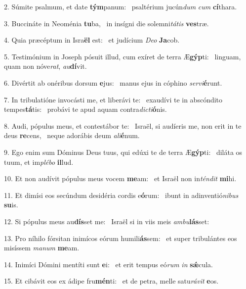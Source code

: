 2. Súmite psalmum, et date \textbf{tým}panum: \ast\  psaltérium jucún\textit{dum} \textit{cum} \textbf{cí}thara.\

3. Buccináte in Neoménia \textbf{tu}ba, \ast\  in insígni die solemni\textit{tá}\textit{tis} \textbf{ves}træ.\

4. Quia præcéptum in Isra\textbf{ël} est: \ast\  et judícium \textit{De}\textit{o} \textbf{Ja}cob.\

5. Testimónium in Joseph pósuit illud, cum exíret de terra Æ\textbf{gýp}ti: \ast\  linguam, quam non nóve\textit{rat}, \textit{au}\textbf{dí}vit.\

6. Divértit ab onéribus dorsum \textbf{e}jus: \ast\  manus ejus in cóphino \textit{ser}\textit{vi}\textbf{é}runt.\

7. In tribulatióne invocásti me, et liberávi te: \dag\  exaudívi te in abscóndito tempes\textbf{tá}tis: \ast\  probávi te apud aquam contra\textit{dic}\textit{ti}\textbf{ó}nis.\

8. Audi, pópulus meus, et contestábor te: \dag\  Israël, si audíeris me, non erit in te deus \textbf{re}cens, \ast\  neque adorábis deum \textit{a}\textit{li}\textbf{é}num.\

9. Ego enim sum Dóminus Deus tuus, qui edúxi te de terra Æ\textbf{gýp}ti: \ast\  diláta os tuum, et im\textit{plé}\textit{bo} \textbf{il}lud.\

10. Et non audívit pópulus meus vocem \textbf{me}am: \ast\  et Israël non in\textit{tén}\textit{dit} \textbf{mi}hi.\

11. Et dimísi eos secúndum desidéria cordis e\textbf{ó}rum: \ast\  ibunt in adinventió\textit{ni}\textit{bus} \textbf{su}is.\

12. Si pópulus meus au\textbf{dís}set me: \ast\  Israël si in viis meis \textit{am}\textit{bu}\textbf{lás}set:\

13. Pro níhilo fórsitan inimícos eórum humili\textbf{ás}sem: \ast\  et super tribulántes eos misíssem \textit{ma}\textit{num} \textbf{me}am.\

14. Inimíci Dómini mentíti sunt \textbf{e}i: \ast\  et erit tempus eó\textit{rum} \textit{in} \textbf{sǽ}cula.\

15. Et cibávit eos ex ádipe fru\textbf{mén}ti: \ast\  et de petra, melle satu\textit{rá}\textit{vit} \textbf{e}os.\

